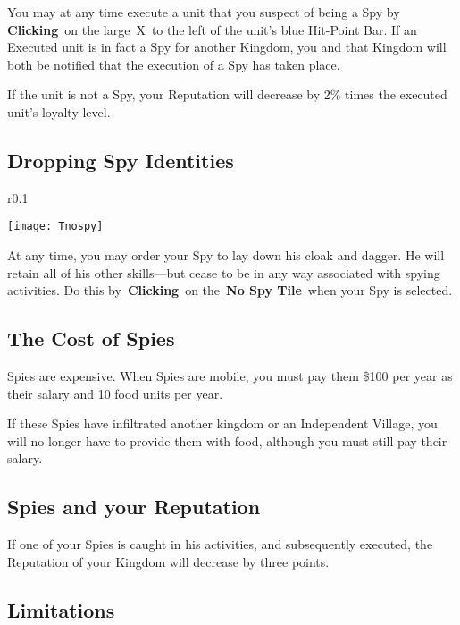 You may at any time execute a unit that you suspect of being a Spy by \textbf{Clicking} on the large X to the left of the unit’s blue Hit-Point Bar. If an Executed unit is in fact a Spy for another Kingdom, you and that Kingdom will both be notified that the execution of a Spy has taken place.


If the unit is not a Spy, your Reputation will decrease by 2\% times the executed unit’s loyalty level.

\subsection{Dropping Spy Identities}

\begin{wrapfigure}{r}{0.1\textwidth}
	\vspace{-20pt}
	\begin{center}
		\texttt{[image: Tnospy]}
	\end{center}
	\vspace{-20pt}
\end{wrapfigure}

At any time, you may order your Spy to lay down his cloak and dagger. He will retain all of his other skills---but cease to be in any way associated with spying activities. Do this by \textbf{Clicking} on the \textbf{No Spy Tile} when your Spy is selected.

\subsection{The Cost of Spies}

Spies are expensive. When Spies are mobile, you must pay them \$100 per year as their salary and 10 food units per year.

If these Spies have infiltrated another kingdom or an Independent Village, you will no longer have to provide them with food, although you must still pay their salary.

\subsection{Spies and your Reputation}

If one of your Spies is caught in his activities, and subsequently executed, the Reputation of your Kingdom will decrease by three points.

\subsection{Limitations}

